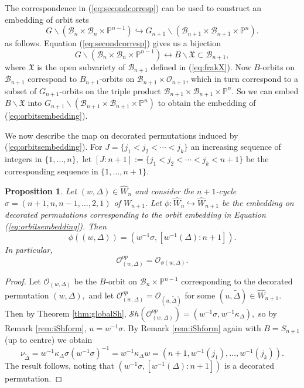 \documentclass[12pt]{amsart}
\numberwithin{equation}{section}
\newtheorem{prop}[thm]{Proposition}
\newcommand{\cW}{{ W}}
\newcommand{\B}{\mathcal{B}}
\newcommand{\Sh}{\mathcal{S}h}
\begin{document}
The correspondence in (\ref{eq:secondcorresp}) can be used to construct an embedding of orbit sets 
\begin{equation}\label{eq:orbitsembedding}
G\backslash (\B_{n}\times\B_{n}\times \mathbb{P}^{n-1})\hookrightarrow G_{n+1}\backslash (\B_{n+1}\times\B_{n+1}\times \mathbb{P}^{n}).
\end{equation}
as follows.  Equation (\ref{eq:secondcorresp}) gives us a bijection 
$$
G\backslash (\B_{n}\times\B_{n}\times \mathbb{P}^{n-1})\leftrightarrow B\backslash\mathfrak{X} \subset \B_{n+1},
$$
where $\mathfrak{X}$ is the open subvariety of $\B_{n+1}$ defined in (\ref{eq:frakX}).
Now $B$-orbits on $\B_{n+1}$ correspond to $B_{n+1}$-orbits on $\B_{n+1}\times\mathcal{O}_{n+1}$, which in turn correspond to a subset of $G_{n+1}$-orbits on the triple product $\B_{n+1}\times\B_{n+1}\times\mathbb{P}^{n}$.  So we can embed $B\backslash \mathfrak{X}$ into  $G_{n+1}\backslash (\B_{n+1}\times\B_{n+1}\times \mathbb{P}^{n})$ to obtain the embedding of (\ref{eq:orbitsembedding}).


We now describe the map on decorated permutations induced by (\ref{eq:orbitsembedding}).  For $J=\{ j_1 < j_2 < \cdots < j_k \}$ an increasing sequence of integers in $\{ 1, \dots, n \},$ let $[J:n+1]:=\{ j_1 < j_2 < \cdots < j_k < n+1 \}$ be the corresponding sequence in $\{ 1, \dots, n+1 \}.$
\begin{prop}\label{p:marked}
Let $(w,\Delta)\in\widehat{\cW}_{n}$ and consider the $n+1$-cycle $\sigma=(n+1, n, n-1,\dots, 2, 1)$ of $\cW_{n+1}.$    Let $\phi: \widehat{\cW}_{n}\hookrightarrow \widehat{\cW}_{n+1}$ be the embedding on decorated permutations corresponding to the orbit embedding in Equation (\ref{eq:orbitsembedding}).  Then 
\begin{equation}\label{eq:permutation}
\phi((w,\Delta))=(w^{-1}\sigma, [w^{-1}(\Delta):n+1]).
\end{equation}
In particular, 
\begin{equation}\label{eq:opdecorated}
\mathcal{O}_{(w,\Delta)}^{op}=\mathcal{O}_{\phi(w,\Delta)}.
\end{equation}
\end{prop}
\begin{proof}
Let $\mathcal{O}_{(w,\Delta)}$ be the $B$-orbit on $\B_{n}\times \mathbb{P}^{n-1}$ corresponding to the decorated permutation $(w, \Delta),$ and let $\mathcal{O}_{(w,\Delta)}^{op}=\mathcal{O}_{(u,\tilde{\Delta})}$ for some $(u,\tilde{\Delta}) \in\widehat{\cW}_{n+1}$.  
 Then by Theorem \ref{thm:globalSh}, $\Sh(\mathcal{O}_{(w,\Delta)}^{op})=(w^{-1}\sigma, w^{-1}\kappa_{\Delta}),$ so by Remark  \ref{rem:iShform}, $u=w^{-1}\sigma$.  By Remark \ref{rem:iShform} again with $B=S_{n+1}$ (up to centre) we obtain  
\[
\nu_{\tilde{\Delta}}= w^{-1}\kappa_{\Delta} \sigma (w^{-1}\sigma)^{-1} = 
w^{-1}\kappa_{\Delta} w=(n+1, w^{-1}(j_{1}), \dots, w^{-1}(j_{k})).
\]
  The result follows, noting that $(w^{-1}\sigma, [w^{-1}(\Delta):n+1])$ is a decorated permutation.
\end{proof} 
\end{document}
